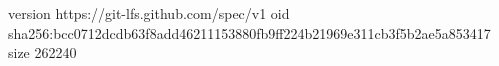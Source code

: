 version https://git-lfs.github.com/spec/v1
oid sha256:bcc0712dcdb63f8add46211153880fb9ff224b21969e311cb3f5b2ae5a853417
size 262240
